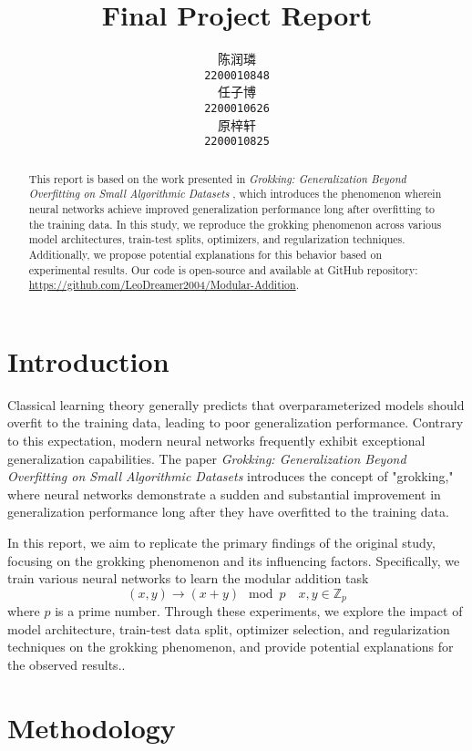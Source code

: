 \documentclass{article}
\title{Final Project Report}
\author{
    陈润璘 \\
    \texttt{2200010848} \\
    \And
    任子博 \\
    \texttt{2200010626} \\
    \And
    原梓轩 \\
    \texttt{2200010825} \\
}
\begin{document}
\maketitle

\begin{abstract}
    This report is based on the work presented in \textit{Grokking: Generalization Beyond Overfitting on Small Algorithmic Datasets} \cite{power2022grokking}, which introduces the phenomenon wherein neural networks achieve improved generalization performance long after overfitting to the training data. In this study, we reproduce the grokking phenomenon across various model architectures, train-test splits, optimizers, and regularization techniques. Additionally, we propose potential explanations for this behavior based on experimental results. Our code is open-source and available at GitHub repository: \url{https://github.com/LeoDreamer2004/Modular-Addition}.
\end{abstract}

\section{Introduction}

Classical learning theory generally predicts that overparameterized models should overfit to the training data, leading to poor generalization performance. Contrary to this expectation, modern neural networks frequently exhibit exceptional generalization capabilities. The paper \textit{Grokking: Generalization Beyond Overfitting on Small Algorithmic Datasets} introduces the concept of "grokking," where neural networks demonstrate a sudden and substantial improvement in generalization performance long after they have overfitted to the training data.

In this report, we aim to replicate the primary findings of the original study, focusing on the grokking phenomenon and its influencing factors. Specifically, we train various neural networks to learn the modular addition task 
$$(x, y) \rightarrow (x + y) \mod p \quad x, y \in \mathbb{Z}_p$$
where $p$ is a prime number. Through these experiments, we explore the impact of model architecture, train-test data split, optimizer selection, and regularization techniques on the grokking phenomenon, and provide potential explanations for the observed results..

\section{Methodology}
\end{document}
